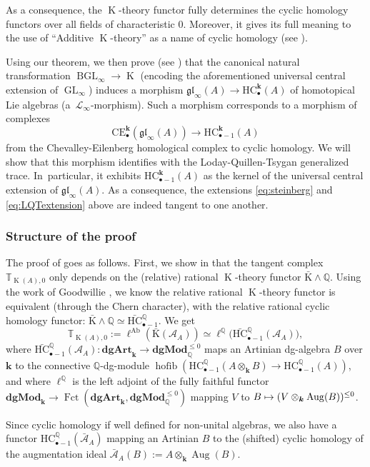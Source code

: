 \documentclass[JEP,XML,SOM,Unicode,NoEqCountersInSection]{cedram}
\let\mathcal\mathscr
\let\autoref\Cref
\newcommand\mto{\mathchoice{\longmapsto}{\mapsto}{\mapsto}{\mapsto}}
\let\widebar\bar
\newcommand{\sbullet}{{\scriptscriptstyle\bullet}}
\theoremstyle{definition}
\newcommand{\Q}{\mathbb{Q}}
\newcommand{\T}{\mathbb{T}}
\newcommand{\dgArt}{\mathbf{dgArt}}
\newcommand{\dgMod}{\mathbf{dgMod}}
\DeclareMathOperator{\Fct}{Fct}
\DeclareMathOperator{\BGL}{BGL}
\DeclareMathOperator{\K}{K}
\newcommand{\gl}{\mathfrak{gl}}
\newcommand{\GL}{\operatorname{GL}}
\newcommand{\bK}{\widebar{\mathrm{K}}}
\newcommand{\HC}{\mathrm{HC}}
\newcommand{\Aug}{\operatorname{Aug}}
\newcommand{\bHC}{\widebar{\mathrm{HC}}{}}
\renewcommand{\k}{{\boldsymbol{k}}}
\newcommand{\ellAb}{\operatorname{\ell^{Ab}}}
\newcommand{\ellQ}{\operatorname{\ell^\Q}}
\newcommand{\Ac}{\mathcal{A}}
\newcommand{\bAc}{\widebar{\mathcal{A}}}
\newcommand{\CE}{\mathrm{CE}}
\newcommand{\hofib}{\operatorname{hofib}}
\begin{document}
As a consequence, the $\K$-theory functor fully determines the cyclic homology functors over all fields of characteristic $0$.
Moreover, it gives its full meaning to the use of ``Additive $\K$-theory'' as a name of cyclic homology (see \cite{feigintsygan:addK}).

Using our theorem, we then prove (see \autoref{thm:compLQT}) that the canonical natural transformation $\BGL_\infty \to \K$ (encoding the aforementioned universal central extension of $\GL_\infty$) induces a morphism $\gl_\infty(A) \to \HC_\sbullet^\k(A)$ of homotopical Lie algebras (\ie a~$\mathcal L_\infty$-morphism). Such a morphism corresponds to a morphism of complexes
\[
\CE_\sbullet^{\k}(\gl_\infty(A)) \to \HC_{\sbullet-1}^\k(A)
\]
from the Chevalley-Eilenberg homological complex to cyclic homology. We will show that this morphism identifies with the Loday-Quillen-Tsygan generalized trace. In~particular, it exhibits $\HC_{\sbullet - 1}^\k(A)$ as the kernel of the universal central extension of $\gl_\infty(A)$.
As a consequence, the extensions \eqref{eq:steinberg} and \eqref{eq:LQTextension} above are indeed tangent to one another.

\subsubsection*{Structure of the proof}
The proof of \autoref{thmintro} goes as follows. First, we show in \autoref{subsec:FMPQ} that the tangent complex $\T_{\K(A),0}$ only depends on the (relative) rational $\K$-theory functor $\bK \wedge \Q$.
Using the work of Goodwillie \cite{goodwillie:tangentk}, we know the relative rational
$\K$-theory functor is equivalent (through the Chern character), with the relative rational cyclic homology functor: $\bK \wedge \Q \simeq \bHC_{\sbullet-1}^\Q$.
We get
\[
\T_{\K(A),0} := \ellAb(\bK(\Ac_A)) \simeq \ellQ\bigl(\bHC_{\sbullet -1}^\Q(\Ac_A)\bigr),
\]
where $\bHC^\Q_{\sbullet-1}(\Ac_A) \colon \dgArt_\k \to \dgMod_\Q^{\leq 0}$ maps an Artinian dg-algebra $B$ over $\k$ to the connective $\Q$-dg-module $\hofib(\HC_{\sbullet -1}^\Q(A \otimes_\k B) \to \HC_{\sbullet -1}^\Q(A))$, and where $\ellQ$ is the left adjoint of the fully faithful functor $\dgMod_\k \to \Fct(\dgArt_\k,\dgMod_\Q^{\leq 0})$ mapping $V$ to $B \mto (V \otimes_\k \Aug(B)) ^{\leq 0}$.

Since cyclic homology if well defined for non-unital algebras, we also have a functor $\HC_{\sbullet-1}^\Q(\bAc_A)$ mapping an Artinian $B$ to the (shifted) cyclic homology of the augmentation ideal $\bAc_A(B) := A \otimes_\k \Aug(B)$.
\end{document}
